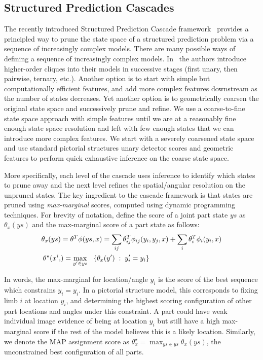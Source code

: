 \subsection*{Structured Prediction Cascades} \label{cascades}
The recently introduced Structured Prediction Cascade framework~\cite{cascades} provides a principled way to prune the state space of a structured prediction problem via a sequence of increasingly complex models.
There are many possible ways of defining a sequence of increasingly complex models.  In~\cite{cascades} the authors introduce higher-order cliques into their models in successive stages (first unary, then pairwise, ternary, etc.).  Another option is to start with simple but computationally efficient features, and add more complex features downstream as the number of states decreases.  Yet another option is to geometrically coarsen the original state space and successively prune and refine.
We use a coarse-to-fine state space approach with simple features until we are at a reasonably fine enough state space resolution and left with few enough states that we can introduce more complex features.  We start with a severely coarsened state space and use standard pictorial structures unary detector scores and geometric features to perform quick exhaustive inference on the coarse state space.  

More specifically, each level of the cascade uses inference to identify which states to prune away and the next level refines the spatial/angular resolution on the unpruned states.
The key ingredient to the cascade framework is that states are pruned using {\em max-marginal} scores, computed using dynamic programming techniques.  For brevity of notation, define the score of a joint part state $ys$ as $\theta_x(ys)$ and the max-marginal score of a part state as follows:
\begin{align}
\theta_x(ys) &= \theta^T \phi(ys,x)= \sum_{ij}  \theta_{ij}^T \phi_{ij}(y_i,y_j,x) +
\sum_i \theta_i^T\phi_i(y_i,x) \\
\mmi  &= \max_{y' \in ys} \;\;\; \{ \theta_x(y') \; : \; y_i'=y_i \}
\end{align}

In words, the max-marginal for location/angle $y_i$ is the score of the best sequence which constrains $y_i = y_i$.  In a pictorial structure model, this corresponds to fixing limb $i$ at location $y_i$, and determining the highest scoring configuration of other part locations and angles under this constraint.  A part could have weak individual image evidence of being at location $y_i$ but still have a high max-marginal score if the rest of the model believes this is a likely location.  Similarly, we denote the MAP assignment score as
$\theta_x^\star = \max_{ys \in ys} \theta_x(ys)$, the unconstrained best configuration of all parts.

